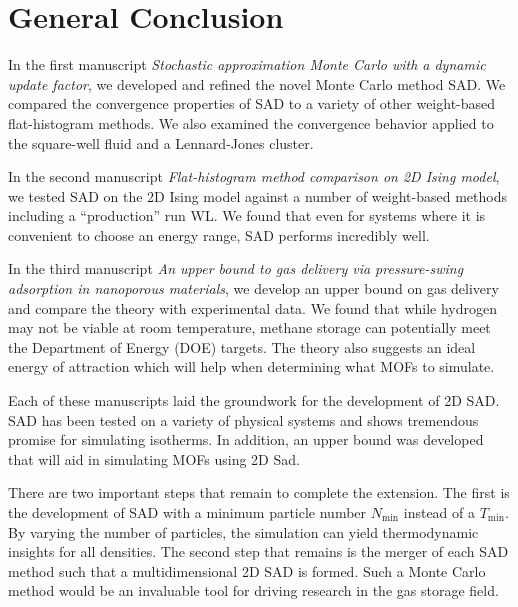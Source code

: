 \chapter{General Conclusion}

In the first manuscript \emph{Stochastic approximation Monte Carlo with a dynamic update factor}, we developed and refined the novel Monte Carlo method SAD. We compared the convergence properties of SAD to a variety of other weight-based flat-histogram methods. We also examined the convergence behavior applied to the square-well fluid and a Lennard-Jones cluster.

In the second manuscript \emph{Flat-histogram method comparison on 2D Ising model}, we tested SAD on the 2D Ising model against a number of weight-based methods including a ``production'' run WL. We found that even for systems where it is convenient to choose an energy range, SAD performs incredibly well.

In the third manuscript \emph{An upper bound to gas delivery via pressure-swing adsorption in nanoporous materials}, we develop an upper bound on gas delivery and compare the theory with experimental data. We found that while hydrogen may not be viable at room temperature, methane storage can potentially meet the Department of Energy (DOE) targets. The theory also suggests an ideal energy of attraction which will help when determining what MOFs to simulate.

Each of these manuscripts laid the groundwork for the development of 2D SAD. SAD has been tested on a variety of physical systems and shows tremendous promise for simulating isotherms. In addition, an upper bound was developed that will aid in simulating MOFs using 2D Sad.

There are two important steps that remain to complete the extension.  The first is the development of SAD with a minimum particle number $N_{\min}$ instead of a $T_{\min}$. By varying the number of particles, the simulation can yield thermodynamic insights for all densities. The second step that remains is the merger of each SAD method such that a multidimensional 2D SAD is formed. Such a Monte Carlo method would be an invaluable tool for driving research in the gas storage field.